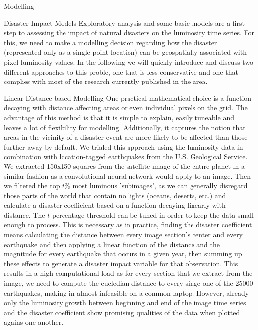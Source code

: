 \documentclass[12pt,fleqn,leqno,letterpaper]{article}
\begin{document}
\begin{section}{Modelling}
  \begin{subsection}{Disaster Impact Models}
    Exploratory analysis and some basic models are a first step to assessing the impact of natural disasters on the luminosity time series. For this, we need to make a modelling decision regarding how the disaster (represented only as a single point location) can be geospatially associated with pixel luminosity values. In the following we will quickly introduce and discuss two different approaches to this proble, one that is less conservative and one that complies with most of the research currently published in the area.
    \begin{subsubsection}{Linear Distance-based Modelling}
      One practical mathematical choice is a function decaying with distance affecting areas or even individual pixels on the grid. The advantage of this method is that it is simple to explain, easily tuneable and leaves a lot of flexibility for modelling. Additionally, it captures the notion that areas in the vicinity of a disaster event are more likely to be affected than those further away by default.
      We trialed this approach using the luminosity data in combination with location-tagged earthquakes from the U.S. Geological Service. We extracted 150x150 squares from the satellite image of the entire planet in a similar fashion as a convolutional neural network would apply to an image. Then we filtered the top $t\%$ most luminous 'subimages', as we can generally disregard those parts of the world that contain no lights (oceans, deserts, etc.) and calculate a disaster coefficient based on a function decaying linearly with distance. The $t$ percentage threshold can be tuned in order to keep the data small enough to process. This is necessary as in practice, finding the disaster coefficient means calculating the distance between every image section's center and every earthquake and then applying a linear function of the distance and the magnitude for every earthquake that occurs in a given year, then summing up these effects to generate a disaster impact variable for that observation. This results in a high computational load as for every section that we extract from the image, we need to compute the eucledian distance to every singe one of the 25000 earthquakes, making in almost infeasible on a common laptop. However, already only the luminosity growth between beginning and end of the image time series and the disaster coefficient show promising qualities of the data when plotted agains one another.

\end{subsubsection}
\end{subsection}
\end{section}
\end{document}

